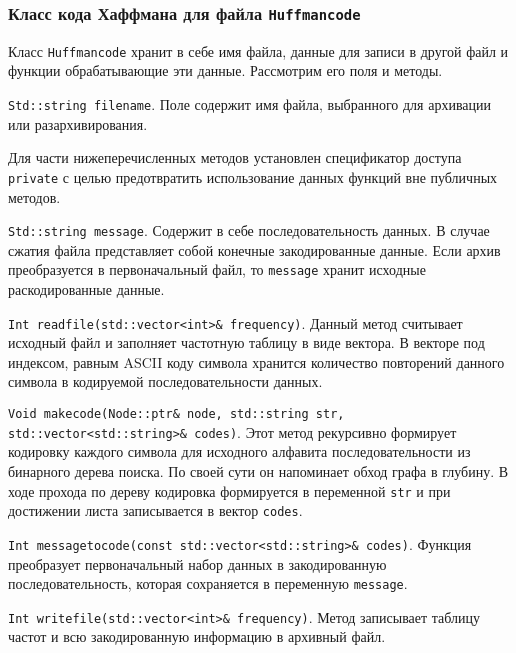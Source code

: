 \subsubsection{Класс кода Хаффмана для файла \texttt{Huffman{\textunderscore}code}}


Класс \texttt{Huffman{\textunderscore}code} хранит в себе имя файла, данные для записи в другой файл и функции обрабатывающие эти данные.
Рассмотрим его поля и методы.



\texttt{Std::string filename}.
Поле содержит имя файла, выбранного для архивации или разархивирования.



Для части нижеперечисленных методов установлен спецификатор доступа \texttt{private}\cite{lucik} с целью предотвратить использование данных функций вне публичных методов.

 

\texttt{Std::string message}.
Содержит в себе последовательность данных.
В случае сжатия файла представляет собой конечные закодированные данные.
Если архив преобразуется в первоначальный файл, то \texttt{message} хранит исходные раскодированные данные.



\texttt{Int read{\textunderscore}file(std::vector<int>\& frequency)}.
Данный метод считывает исходный файл и заполняет частотную таблицу в виде вектора.
В векторе под индексом, равным ASCII коду символа хранится количество повторений данного символа в кодируемой последовательности данных.



\texttt{Void make{\textunderscore}code(Node::ptr\& node, std::string str, std::vector<std::string>\& codes)}.
Этот метод рекурсивно формирует кодировку каждого символа для исходного алфавита последовательности из бинарного дерева поиска.
По своей сути он напоминает обход графа в глубину\cite{algo}.
В ходе прохода по дереву кодировка формируется в переменной \texttt{str} и при достижении листа записывается в вектор \texttt{codes}.



\texttt{Int message{\textunderscore}to{\textunderscore}code(const std::vector<std::string>\& codes)}.
Функция преобразует первоначальный набор данных в закодированную последовательность, которая сохраняется в переменную \texttt{message}.



\texttt{Int write{\textunderscore}file(std::vector<int>\& frequency)}.
Метод записывает таблицу частот и всю закодированную информацию в архивный файл.



